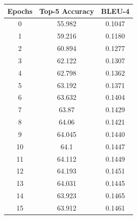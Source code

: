 \documentclass[11pt,a4paper]{article}
\begin{document}
\begin{table}
\centering
\begin{tabular}{|c|c|c|} 
\hline
\rowcolor[rgb]{0.761,0.761,0.761} \textbf{Epochs} & \textbf{Top-5 Accuracy} & \textbf{BLEU-4}  \\ 
\hline
0                                                 & 55.982                  & 0.1047           \\ 
\hline
1                                                 & 59.216                  & 0.1180           \\ 
\hline
2                                                 & 60.894                  & 0.1277           \\ 
\hline
3                                                 & 62.122                  & 0.1307           \\ 
\hline
4                                                 & 62.798                  & 0.1362           \\ 
\hline
5                                                 & 63.192                  & 0.1371           \\ 
\hline
6                                                 & 63.632                  & 0.1404           \\ 
\hline
7                                                 & 63.87                   & 0.1429           \\ 
\hline
8                                                 & 64.06                   & 0.1421           \\ 
\hline
9                                                 & 64.045                  & 0.1440           \\ 
\hline
10                                                & 64.1                    & 0.1447           \\ 
\hline
11                                                & 64.112                  & 0.1449           \\ 
\hline
12                                                & 64.193                  & 0.1451           \\ 
\hline
13                                                & 64.031                  & 0.1445           \\ 
\hline
\rowcolor[rgb]{0.992,0.992,0.588} 14              & 63.923                  & 0.1465           \\ 
\hline
15                                                & 63.912                  & 0.1461           \\ 

\end{tabular}
\end{table}
\end{document}
